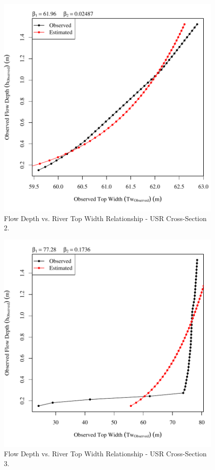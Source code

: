 \begin{center}
\begin{figure}[htbp]
	\includegraphics[width=6in]{"Figures/Results_USR/Survey Tw vs H-Section 2"}
	\caption{Flow Depth vs. River Top Width Relationship - USR Cross-Section 2.}
\end{figure}
\end{center}
\newpage

\begin{center}
\begin{figure}[htbp]
	\includegraphics[width=6in]{"Figures/Results_USR/Survey Tw vs H-Section 3"}
	\caption{Flow Depth vs. River Top Width Relationship - USR Cross-Section 3.}
\end{figure}
\end{center}
\newpage

